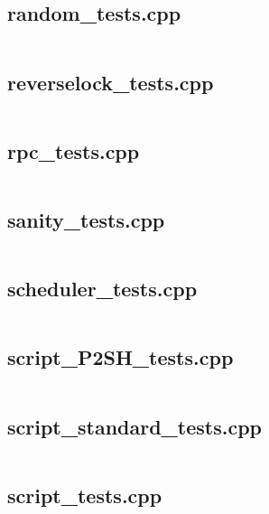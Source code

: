 \documentclass{article}
\begin{document}
\subsection{random\_tests.cpp}
\inputminted{cpp}{/home/dufferzafar/dev/@clones/bitcoin/src/test/random_tests.cpp}
\newpage

\subsection{reverselock\_tests.cpp}
\inputminted{cpp}{/home/dufferzafar/dev/@clones/bitcoin/src/test/reverselock_tests.cpp}
\newpage

\subsection{rpc\_tests.cpp}
\inputminted{cpp}{/home/dufferzafar/dev/@clones/bitcoin/src/test/rpc_tests.cpp}
\newpage

\subsection{sanity\_tests.cpp}
\inputminted{cpp}{/home/dufferzafar/dev/@clones/bitcoin/src/test/sanity_tests.cpp}
\newpage

\subsection{scheduler\_tests.cpp}
\inputminted{cpp}{/home/dufferzafar/dev/@clones/bitcoin/src/test/scheduler_tests.cpp}
\newpage

\subsection{script\_P2SH\_tests.cpp}
\inputminted{cpp}{/home/dufferzafar/dev/@clones/bitcoin/src/test/script_P2SH_tests.cpp}
\newpage

\subsection{script\_standard\_tests.cpp}
\inputminted{cpp}{/home/dufferzafar/dev/@clones/bitcoin/src/test/script_standard_tests.cpp}
\newpage

\subsection{script\_tests.cpp}
\inputminted{cpp}{/home/dufferzafar/dev/@clones/bitcoin/src/test/script_tests.cpp}
\newpage
\end{document}
